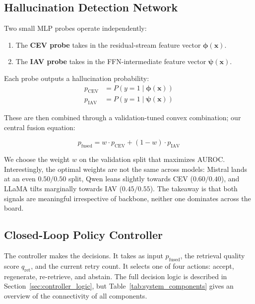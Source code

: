 \subsection{Hallucination Detection Network}
\label{subsec:detection_network}

Two small MLP probes operate independently:
\begin{enumerate}
    \item The \textbf{CEV probe} takes in the residual-stream feature vector $\boldsymbol{\phi}(\mathbf{x})$.
    \item The \textbf{IAV probe} takes in the FFN-intermediate feature vector $\boldsymbol{\psi}(\mathbf{x})$.
\end{enumerate}

Each probe outputs a hallucination probability:
\begin{align}
    p_{\text{CEV}} &= P(y = 1 \mid \boldsymbol{\phi}(\mathbf{x})) \label{eq:pcev}\\[4pt]
    p_{\text{IAV}} &= P(y = 1 \mid \boldsymbol{\psi}(\mathbf{x})) \label{eq:piav}
\end{align}

\noindent These are then combined through a validation-tuned convex combination; our central fusion equation:

\begin{equation}
    \boxed{\;p_{\text{fused}} = w \cdot p_{\text{CEV}} + (1 - w) \cdot p_{\text{IAV}}\;}
    \label{eq:pfused}
\end{equation}

We choose the weight $w$ on the validation split that maximizes AUROC. Interestingly, the optimal weights are not the same across models: Mistral lands at an even $0.50/0.50$ split, Qwen leans slightly towards CEV ($0.60/0.40$), and LLaMA tilts marginally towards IAV ($0.45/0.55$). The takeaway is that both signals are meaningful irrespective of backbone, neither one dominates across the board.

\subsection{Closed-Loop Policy Controller}
\label{subsec:controller_overview}

The controller makes the decisions. It takes as input $p_{\text{fused}}$, the retrieval quality score $q_{\text{ret}}$, and the current retry count. It selects one of four actions: accept, regenerate, re-retrieve, and abstain. The full decision logic is described in Section~\ref{sec:controller_logic}, but Table~\ref{tab:system_components} gives an overview of the connectivity of all components.

